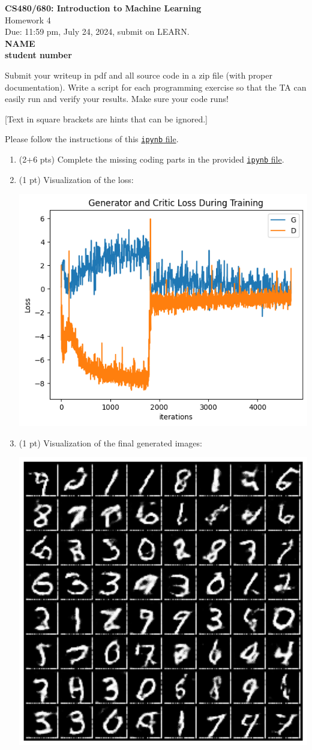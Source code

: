 \documentclass[10pt]{article}
\newcommand{\red}[1]{{\color{red}#1}}
\newcommand{\green}[1]{{\color{green}#1}}
\begin{document}
\begin{center}
	\large{\textbf{CS480/680: Introduction to Machine Learning} \\ Homework 4\\ \red{Due: 11:59 pm, July 24, 2024}, \red{submit on LEARN}.} \\

	{\bf \green{NAME}} \\
	{\bf \green{student number}}

\end{center}

\begin{center}
	Submit your writeup in pdf and all source code in a zip file (with proper documentation). Write a script for each programming exercise so that the TA can easily run and verify your results. Make sure your code runs!

	[Text in square brackets are hints that can be ignored.]
\end{center}

\begin{exercise}
	Please follow the instructions of this \href{https://cs.uwaterloo.ca/~y328yu/mycourses/480/a4-wgan.ipynb}{\texttt{ipynb} file}.

	\begin{enumerate}
		\item (2+6 pts) Complete the missing coding parts in the provided \href{https://cs.uwaterloo.ca/~y328yu/mycourses/480/a4-wgan.ipynb}{\texttt{ipynb} file}.

		\item (1 pt) Visualization of the loss:

		      \includegraphics[width=.45\textwidth]{plot/ex1/loss.png}

		\item (1 pt) Visualization of the final generated images:

		      \includegraphics[width=.45\textwidth]{plot/ex1/generation.png}
	\end{enumerate}
\end{exercise}
\end{document}
